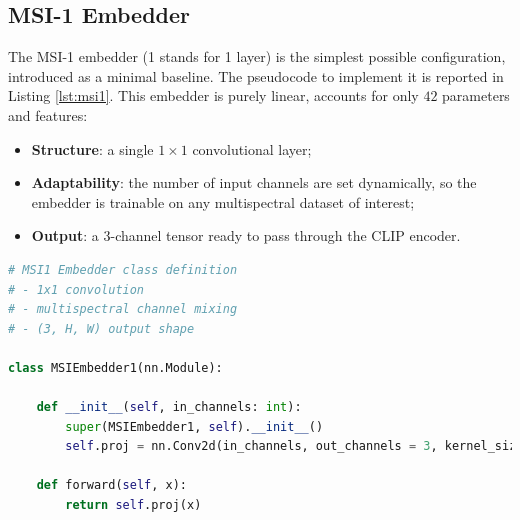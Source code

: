 \documentclass[a4paper, oneside, english]{sapthesis} %
\begin{document}

\subsection{MSI-1 Embedder}

The MSI-1 embedder (1 stands for 1 layer) is the simplest possible configuration, introduced as a minimal baseline. The pseudocode to implement it is reported in Listing \ref{lst:msi1}. This embedder is purely linear, accounts for only $42$ parameters and features:

\begin{itemize}
    \item \textbf{Structure}: a single $1\times1$ convolutional layer;
    \item \textbf{Adaptability}: the number of input channels are set dynamically, so the embedder is trainable on any multispectral dataset of interest;
    \item \textbf{Output}: a 3-channel tensor ready to pass through the CLIP encoder.
\end{itemize}

\vspace{0.5cm}

\begin{lstlisting}[language=Python, caption={MSI-1 Embedder implemented in Pytorch.}, label={lst:msi1}]
# MSI1 Embedder class definition
# - 1x1 convolution
# - multispectral channel mixing
# - (3, H, W) output shape

class MSIEmbedder1(nn.Module):

    def __init__(self, in_channels: int):
        super(MSIEmbedder1, self).__init__()
        self.proj = nn.Conv2d(in_channels, out_channels = 3, kernel_size = 1)

    def forward(self, x):
        return self.proj(x) 
\end{lstlisting}
\end{document}
